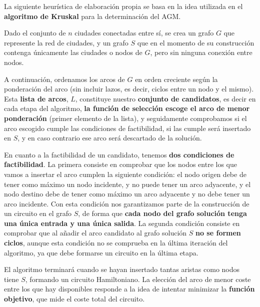 La siguiente heurística de elaboración propia se basa en la idea utilizada en el \textbf{algoritmo de Kruskal} para la determinación del AGM. 

Dado el conjunto de $n$ ciudades conectadas entre sí, se crea un grafo $G$ que represente la red de ciudades, y un grafo $S$ que en el momento de su construcción contenga únicamente las ciudades o nodos de $G$, pero sin ninguna conexión entre nodos.

A continuación, ordenamos los arcos de $G$ en orden creciente según la ponderación del arco (sin incluir lazos, es decir, ciclos entre un nodo y el mismo). Esta \textbf{lista de arcos}, $L$, constituye nuestro \textbf{conjunto de candidatos}, es decir en cada etapa del algoritmo, \textbf{la función de selección escoge el arco de menor ponderación} (primer elemento de la lista), y seguidamente comprobamos si el arco escogido cumple las condiciones de factibilidad, si las cumple será insertado en $S$, y en caso contrario ese arco será descartado de la solución. 

En cuanto a la factibilidad de un candidato, tenemos \textbf{dos condiciones de factibilidad}. La primera consiste en comprobar que los nodos entre los que vamos a insertar el arco cumplen la siguiente condición: el nodo origen debe de tener como máximo un nodo incidente, y no puede tener un arco adyacente, y el nodo destino debe de tener como máximo un arco adyacente y no debe tener un arco incidente. Con esta condición nos garantizamos parte de la construcción de un circuito en el grafo $S$, de forma que \textbf{cada nodo del grafo solución tenga una única entrada y una única salida}. La segunda condición consiste en comprobar que al añadir el arco candidato al grafo solución $S$ \textbf{no se formen ciclos}, aunque esta condición no se comprueba en la última iteración del algoritmo, ya que debe formarse un circuito en la última etapa.

El algoritmo terminará cuando se hayan insertado tantas aristas como nodos tiene $S$, formando un circuito Hamiltoniano. La elección del arco de menor coste entre los que hay disponibles responde a la idea de intentar minimizar la \textbf{función objetivo}, que mide el coste total del circuito.

